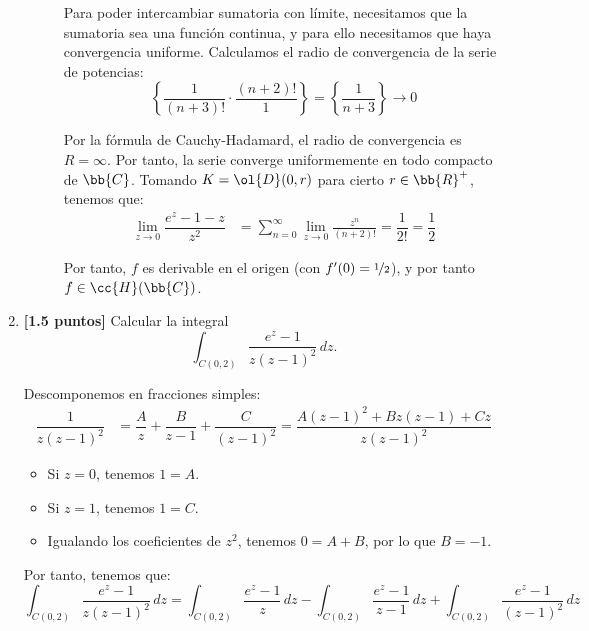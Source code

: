 \documentclass[12pt]{article}
\begin{document}
\begin{ejercicio}
\begin{enumerate}
\begin{description}
                Para poder intercambiar sumatoria con límite, necesitamos que la sumatoria sea una función continua, y para ello necesitamos que haya convergencia uniforme. Calculamos el radio de convergencia de la serie de potencias:
                \begin{equation*}
                    \left\{\frac{1}{(n+3)!}\cdot \dfrac{(n+2)!}{1}\right\} = \left\{\frac{1}{n+3}\right\} \to 0
                \end{equation*}

                Por la fórmula de Cauchy-Hadamard, el radio de convergencia es $R=\infty$. Por tanto, la serie converge uniformemente en todo compacto de $\bb{C}$. Tomando $K=\ol{D}(0,r)$ para cierto $r\in \bb{R}^+$, tenemos que:
                \begin{align*}
                    \lim_{z\to 0} \dfrac{e^z-1-z}{z^2} &= \sum\limits_{n=0}^{\infty}\lim_{z\to 0} \frac{z^n}{(n+2)!} = \dfrac{1}{2!} = \dfrac{1}{2}
                \end{align*}

                Por tanto, $f$ es derivable en el origen (con $f'(0)=\nicefrac{1}{2}$), y por tanto $f\in \cc{H}(\bb{C})$.
            \end{description}

            \item \textbf{[1.5 puntos]} Calcular la integral
            \begin{equation*}
                \int_{C(0,2)} \frac{e^z-1}{z(z - 1)^2} \, dz.
            \end{equation*}
            
            Descomponemos en fracciones simples:
            \begin{align*}
                \dfrac{1}{z(z-1)^2} &= \dfrac{A}{z} + \dfrac{B}{z-1} + \dfrac{C}{(z-1)^2} = \dfrac{A(z-1)^2 + Bz(z-1) + Cz}{z(z-1)^2}
            \end{align*}
            \begin{itemize}
                \item Si $z=0$, tenemos $1=A$.
                \item Si $z=1$, tenemos $1=C$.
                \item Igualando los coeficientes de $z^2$, tenemos $0=A+B$, por lo que $B=-1$.
            \end{itemize}

            Por tanto, tenemos que:
            \begin{equation*}
                \int_{C(0,2)} \frac{e^z-1}{z(z - 1)^2} \, dz = \int_{C(0,2)} \dfrac{e^z-1}{z} \, dz - \int_{C(0,2)} \dfrac{e^z-1}{z-1} \, dz + \int_{C(0,2)} \dfrac{e^z-1}{(z-1)^2} \, dz
            \end{equation*}


\end{enumerate}
\end{ejercicio}
\end{document}
